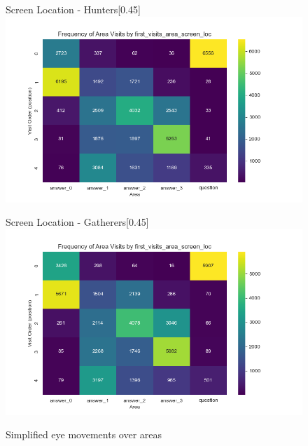 \documentclass{article}
\begin{document}
\begin{figure}[H]
  \vspace{1em} %

  \begin{subcaptionbox}{Screen Location - Hunters\label{fig:sl_h}}[0.45\textwidth]
    {\centering\includegraphics[width=\linewidth]{plots/matrix_first_visits_first_visits_area_screen_loc_hunters.png}}
  \end{subcaptionbox}
  \hfill
  \begin{subcaptionbox}{Screen Location - Gatherers\label{fig:sl_g}}[0.45\textwidth]
    {\centering\includegraphics[width=\linewidth]{plots/matrix_first_visits_first_visits_area_screen_loc_gatherers.png}}
  \end{subcaptionbox}
  
  \caption{Simplified eye movements over areas}
  \label{fig:fourimages11}
\end{figure}
\end{document}
